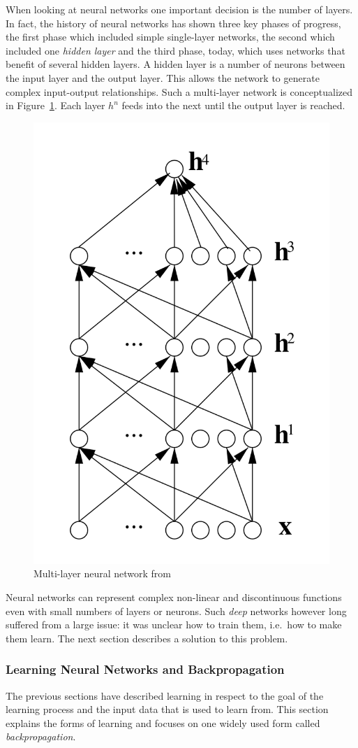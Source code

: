 When looking at neural networks one important decision is the number of layers. In fact, the history of neural networks has shown
three key phases of progress, the first phase which included simple single-layer networks, the second which included one
\emph{hidden layer} and the third phase, today, which uses networks that benefit of several hidden layers. A hidden
layer is a number of neurons between the input layer and the output layer. This allows the network to generate complex
input-output relationships. Such a multi-layer network is conceptualized in Figure~\ref{fig:multilayernn}. Each layer
$h^n$ feeds into the next until the output layer is reached.

\begin{figure}[]
    \centering
    \includegraphics[width=0.3\linewidth]{img/multilayer_nn.png}
    \caption{Multi-layer neural network from \cite[]{bengio2009learning} }
    \label{fig:multilayernn}
\end{figure}

Neural networks can represent complex non-linear and discontinuous functions
\cite[p.732]{russell2016artificial} even with small numbers of layers or neurons. Such \emph{deep} networks however long
suffered from a large issue: it was unclear how to train them, i.e.\ how to make them learn. The next section describes
a solution to this problem.

\subsubsection{Learning Neural Networks and Backpropagation}
\label{sec:Backpropagation}




The previous sections have described learning in respect to the goal of the learning process and the input data that is
used to learn from. This section explains the forms of learning and focuses on one widely used form called \emph{backpropagation}.

